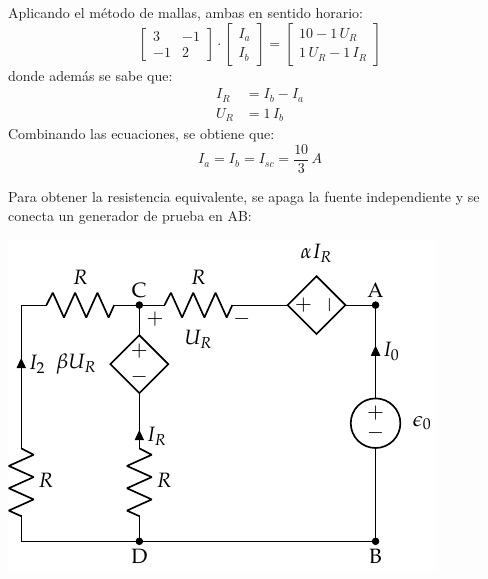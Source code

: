 Aplicando el método de mallas, ambas en sentido horario:
\begin{equation*}
  \begin{bmatrix}
    3 & -1\\
    -1 & 2
  \end{bmatrix}
  \cdot 
  \begin{bmatrix}
    I_a\\
    I_b
  \end{bmatrix}
  = 
  \begin{bmatrix}
    10-1\,U_R\\
    1\,U_R-1\,I_R
  \end{bmatrix}
\end{equation*}
donde además se sabe que:
\begin{align*}
  I_R&=I_b-I_a\\
  U_R&=1\, I_b
\end{align*}
Combinando las ecuaciones, se obtiene que:
\begin{equation*}
  I_a=I_b=I_{sc}=\dfrac{10}{3}\,A
\end{equation*}
    
Para obtener la resistencia equivalente, se apaga la fuente
independiente y se conecta un generador de prueba en AB:
\begin{center}
  \includegraphics{figuras/norton_fuenteprueba.pdf}
\end{center}


